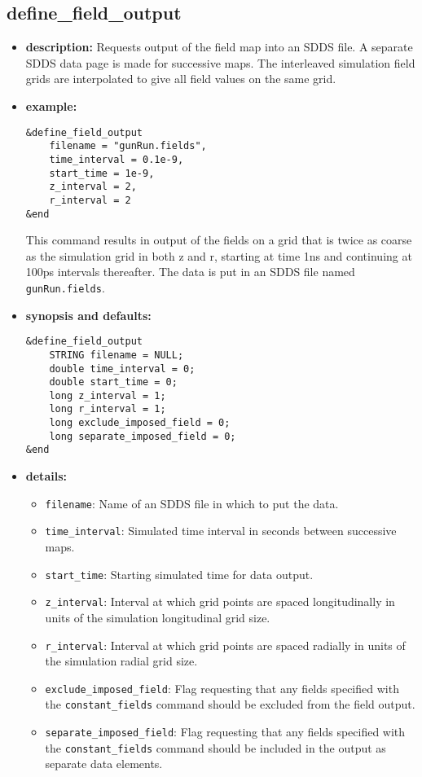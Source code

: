 %
\newpage

\subsection{define\_field\_output}

\begin{itemize}

\item {\bf description:}
Requests output of the field map into an SDDS file.  A separate SDDS
data page is made for successive maps.  The interleaved simulation
field grids are interpolated to give all field values on the same
grid.

\item {\bf example:} 
\begin{verbatim}
&define_field_output
    filename = "gunRun.fields",
    time_interval = 0.1e-9,
    start_time = 1e-9,
    z_interval = 2,
    r_interval = 2
&end
\end{verbatim}
This command results in output of the fields on a grid that is twice
as coarse as the simulation grid in both z and r, starting at time
1ns and continuing at 100ps intervals thereafter.  The data is put
in an SDDS file named {\tt gunRun.fields}.

\item {\bf synopsis and defaults:} 
\begin{verbatim}
&define_field_output
    STRING filename = NULL;
    double time_interval = 0;
    double start_time = 0;
    long z_interval = 1;
    long r_interval = 1;
    long exclude_imposed_field = 0;
    long separate_imposed_field = 0;
&end
\end{verbatim}

\item {\bf details:} 
\begin{itemize}
    \item {\tt filename}: Name of an SDDS file in which to put the data.
    \item {\tt time\_interval}: Simulated time interval in seconds between successive maps.
    \item {\tt start\_time}: Starting simulated time for data output.
    \item {\tt z\_interval}: Interval at which grid points are spaced longitudinally in
        units of the simulation longitudinal grid size.
    \item {\tt r\_interval}: Interval at which grid points are spaced radially in
        units of the simulation radial grid size.
    \item {\tt exclude\_imposed\_field}: Flag requesting that any fields specified with the
        {\tt constant\_fields} command should be excluded from the field output.
    \item {\tt separate\_imposed\_field}: Flag requesting that any fields specified with the
        {\tt constant\_fields} command should be included in the output as separate data elements.
\end{itemize}

\end{itemize}
